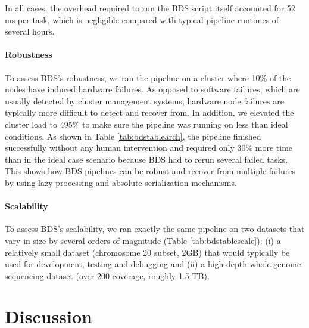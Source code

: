 In all cases, the overhead required to run the BDS script itself accounted for 52 ms per task, which is negligible compared with typical pipeline runtimes of several hours.

\paragraph{Robustness} To assess BDS’s robustness, we ran the pipeline on a cluster where 10\% of the nodes have induced hardware failures. As opposed to software failures, which are usually detected by cluster management systems, hardware node failures are typically more difficult to detect and recover from. In addition, we elevated the cluster load to 495\% to make sure the pipeline was running on less than ideal conditions. As shown in Table \ref{tab:bdstablearch}, the pipeline finished successfully without any human intervention and required only 30\% more time than in the ideal case scenario because BDS had to rerun several failed tasks. This shows how BDS pipelines can be robust and recover from multiple failures by using lazy processing and absolute serialization mechanisms.


\paragraph{Scalability} To assess BDS’s scalability, we ran exactly the same pipeline on two datasets that vary in size by several orders of magnitude (Table \ref{tab:bdstablescale}): (i) a relatively small dataset (chromosome 20 subset, 2GB) that would typically be used for development, testing and debugging and (ii) a high-depth whole-genome sequencing dataset (over 200 coverage, roughly 1.5 TB).
 

\section{Discussion}

